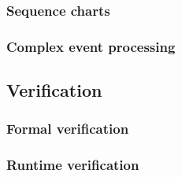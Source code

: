     \subsubsection{Sequence charts}
    \subsubsection{Complex event processing}
  \subsection{Verification}
    \subsubsection{Formal verification}
    \subsubsection{Runtime verification}

%